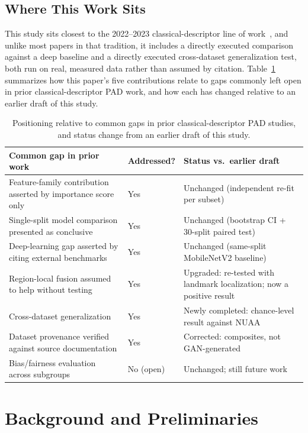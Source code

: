\documentclass[11pt]{article}
\begin{document}
\subsection{Where This Work Sits}

This study sits closest to the 2022--2023 classical-descriptor line of work~\cite{gunay2023,chang2022}, and unlike most papers in that tradition, it includes a directly executed comparison against a deep baseline and a directly executed cross-dataset generalization test, both run on real, measured data rather than assumed by citation. Table~\ref{tab:positioning} summarizes how this paper's five contributions relate to gaps commonly left open in prior classical-descriptor PAD work, and how each has changed relative to an earlier draft of this study.

\begin{table}[htbp]
\centering
\caption{Positioning relative to common gaps in prior classical-descriptor PAD studies, and status change from an earlier draft of this study.}
\label{tab:positioning}
\small
\begin{tabular}{p{4.6cm}p{1.4cm}p{6.4cm}}
\toprule
Common gap in prior work & Addressed? & Status vs.\ earlier draft \\
\midrule
Feature-family contribution asserted by importance score only & Yes & Unchanged (independent re-fit per subset) \\
Single-split model comparison presented as conclusive & Yes & Unchanged (bootstrap CI + 30-split paired test) \\
Deep-learning gap asserted by citing external benchmarks & Yes & Unchanged (same-split MobileNetV2 baseline) \\
Region-local fusion assumed to help without testing & Yes & Upgraded: re-tested with landmark localization; now a positive result \\
Cross-dataset generalization & Yes & Newly completed: chance-level result against NUAA \\
Dataset provenance verified against source documentation & Yes & Corrected: composites, not GAN-generated \\
Bias/fairness evaluation across subgroups & No (open) & Unchanged; still future work \\
\bottomrule
\end{tabular}
\end{table}

\section{Background and Preliminaries}
\end{document}

